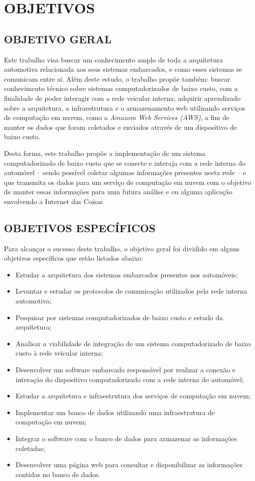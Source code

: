 \chapter{OBJETIVOS}\label{CAP3}

\section{OBJETIVO GERAL}
Este trabalho visa buscar um conhecimento amplo de toda a arquitetura automotiva relacionada aos seus sistemas embarcados, e como esses sistemas se comunicam entre si. Além deste estudo, o trabalho propõe também: buscar conhecimento técnico sobre sistemas computadorizados de baixo custo, com a finalidade de poder interagir com a rede veicular interna; adquirir aprendizado sobre a arquitetura, a infraestrutura e o armazenamento web utilizando serviços de computação em nuvem, como a \textit{Amazom Web Services (AWS)}, a fim de manter os dados que foram coletados e enviados através de um dispositivo de baixo custo.

Desta forma, este trabalho propõe a implementação de um sistema computadorizado de baixo custo que se conecte e interaja com a rede interna do automóvel – sendo possível coletar algumas informações presentes nesta rede – e que transmita os dados para um serviço de computação em nuvem com o objetivo de manter essas informações para uma futura análise e ou alguma aplicação envolvendo a Internet das Coisas.

\section{OBJETIVOS ESPECÍFICOS}
Para alcançar o sucesso deste trabalho, o objetivo geral foi dividido em alguns objetivos específicos que estão listados abaixo:
\begin{itemize}
\item Estudar a arquitetura dos sistemas embarcados presentes nos automóveis;
\item Levantar e estudar os protocolos de comunicação utilizados pela rede interna automotiva;
\item Pesquisar por sistemas computadorizados de baixo custo e estudo da arquitetura;
\item Analisar a viabilidade de integração de um sistema computadorizado de baixo custo à rede veicular interna;
\item Desenvolver um software embarcado responsável por realizar a conexão e interação do dispositivo computadorizado com a rede interna do automóvel;
\item Estudar a arquitetura e infraestrutura dos serviços de computação em nuvem;
\item Implementar um banco de dados utilizando uma infraestrutura de computação em nuvem;
\item Integrar o software com o banco de dados para armazenar as informações coletadas;
\item Desenvolver uma página web para consultar e disponibilizar as informações contidas no banco de dados.
\end{itemize}

